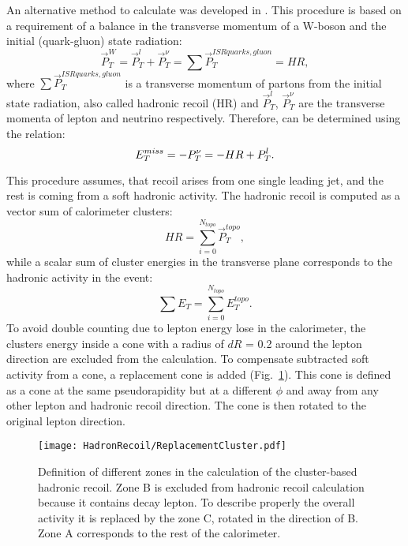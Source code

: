 An alternative method to calculate \etmiss  was developed in \cite{HadrRecoilFirst}. This procedure is based on a requirement of a balance in the transverse momentum of a W-boson and the initial (quark-gluon) state radiation:
\begin{equation}
\vec{P}_{T}^{W} = \vec{P}_T^l+\vec{P}_T^{\nu}= \sum{\vec{P}_{T}^{ISRquarks,gluon}}=HR, 
\end{equation}
where $\sum{\vec{P}_{T}^{ISRquarks,gluon}}$ is a transverse momentum of partons from the initial state radiation, also called hadronic recoil (HR) and $\vec{P}_T^l$, $\vec{P}_T^{\nu}$ are the transverse momenta of lepton and neutrino respectively. Therefore, \etmiss can be determined using the relation:
\begin{equation}
E_{T}^{miss} = - P_T^{\nu} =  - HR + P_T^l.
\end{equation} 

This procedure assumes, that recoil arises from one single leading jet, and the rest  is coming from a soft hadronic activity. The hadronic recoil is computed as a vector sum of calorimeter clusters:
\begin{equation}
HR= \sum_{i=0}^{N_{topo}}\vec{P}_T^{topo},
\end{equation}
while a scalar sum of cluster energies in the transverse plane corresponds to the hadronic activity in the event:
\begin{equation}\label{eq:sumet}
\sum E_T =\sum_{i=0}^{N_{topo}} E_T^{topo}.
\end{equation}
To avoid double counting due to lepton energy lose in the calorimeter, the clusters energy inside a cone with a radius of $dR$ = 0.2 around the lepton direction are excluded from the calculation. To compensate subtracted soft activity from a cone, a replacement cone is added (Fig.~\ref{ris:subsCone}). This cone is defined as a cone at the same pseudorapidity but at a different $\phi$ and away from any other lepton and hadronic recoil direction. The cone is then rotated to the original lepton direction. 

\begin{figure}[!tbp]
\begin{center}
\begin{minipage}[h]{0.49\linewidth}
\texttt{[image: HadronRecoil/ReplacementCluster.pdf]}
\end{minipage}

\caption{Definition of different zones in the calculation of the cluster-based hadronic recoil. Zone B is excluded from hadronic recoil calculation because it contains decay lepton. To describe properly the overall activity it is replaced by the zone C, rotated in the direction of B. Zone A corresponds to the rest of the calorimeter\cite{HRPlots}.}
\label{ris:subsCone}
\end{center}
\end{figure}

